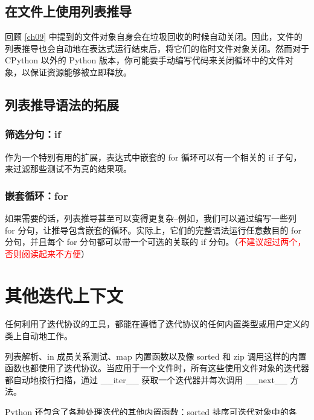 \subsection{在文件上使用列表推导}
\begin{tcolorbox}
    回顾 \autoref{ch09} 中提到的文件对象自身会在垃圾回收的时候自动关闭。因此，文件的列表推导也会自动地在表达式运行结束后，将它们的临时文件对象关闭。然而对于 CPython 以外的 Python 版本，你可能要手动编写代码来关闭循环中的文件对象，以保证资源能够被立即释放。
\end{tcolorbox}
\subsection{列表推导语法的拓展}
\subsubsection{筛选分句：if}
作为一个特别有用的扩展，表达式中嵌套的 for 循环可以有一个相关的 if 子句，来过滤那些测试不为真的结果项。
\subsubsection{嵌套循环：for}
如果需要的话，列表推导甚至可以变得更复杂--例如，我们可以通过编写一些列 for 分句，让推导包含嵌套的循环。实际上，它们的完整语法运行任意数目的 for 分句，并且每个 for 分句都可以带一个可选的关联的 if 分句。（\textcolor{red}{不建议超过两个，否则阅读起来不方便}）
\section{其他迭代上下文}
任何利用了迭代协议的工具，都能在遵循了迭代协议的任何内置类型或用户定义的类上自动地工作。

列表解析、in 成员关系测试、map 内置函数以及像 sorted 和 zip 调用这样的内置函数也都使用了迭代协议。当应用于一个文件时，所有这些使用文件对象的迭代器都自动地按行扫描，通过 \_\_iter\_\_ 获取一个迭代器并每次调用 \_\_next\_\_ 方法。

Python 还包含了各种处理迭代的其他内置函数：sorted 排序可迭代对象中的各项，zip 组合可迭代对象中的各项，enumerate 根据相对位置来配对可迭代对象中的项，filter 选择一个函数为真的项，reduce 针对可迭代对象中的成对的项运行一个函数。所有这些都接受一个可迭代的对象，并且在 Python3.0 中，zip、enumerate 和 filter也像 map 一样返回一个可迭代对象。

有趣的是，在当今的 Python 中，迭代协议甚至比我们目前所能展示的示例要更为普遍——Python 的内置工具集中从左到右地扫描一个对象的每项工具，都定义为在主体对象上使用了迭代协议。这甚至包含了更高级的工具，例如 list 和 tuple 内置函数（它们从可迭代对象构建了一个新的对象），字符串 join 方法（它将一个子字符串放置到一个可迭代对象中包含的字符串之间），甚至包括序列赋值。

